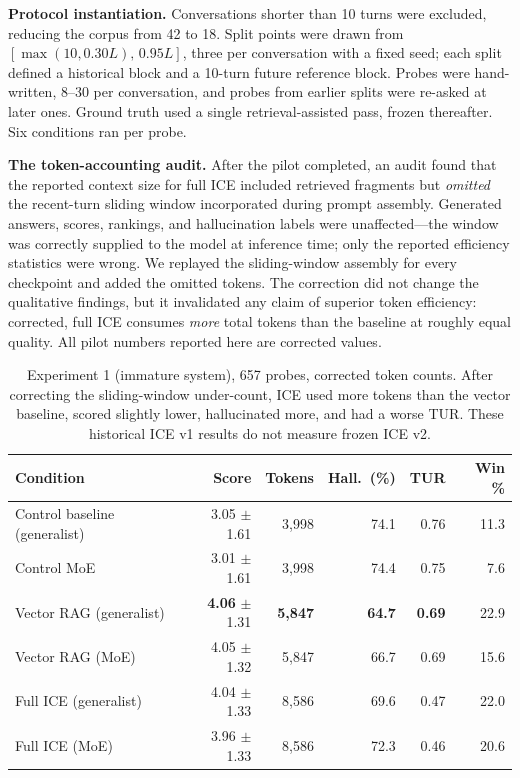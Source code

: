 \documentclass[11pt,a4paper]{article}
\begin{document}
\textbf{Protocol instantiation.} Conversations shorter than 10 turns were excluded, reducing the corpus from 42 to 18. Split points were drawn from $[\max(10,0.30L),\,0.95L]$, three per conversation with a fixed seed; each split defined a historical block and a 10-turn future reference block. Probes were hand-written, 8--30 per conversation, and probes from earlier splits were re-asked at later ones. Ground truth used a single retrieval-assisted pass, frozen thereafter. Six conditions ran per probe.

\textbf{The token-accounting audit.} After the pilot completed, an audit found that the reported context size for full ICE included retrieved fragments but \emph{omitted} the recent-turn sliding window incorporated during prompt assembly. Generated answers, scores, rankings, and hallucination labels were unaffected---the window was correctly supplied to the model at inference time; only the reported efficiency statistics were wrong. We replayed the sliding-window assembly for every checkpoint and added the omitted tokens. The correction did not change the qualitative findings, but it invalidated any claim of superior token efficiency: corrected, full ICE consumes \emph{more} total tokens than the baseline at roughly equal quality. All pilot numbers reported here are corrected values.

\begin{table}[htbp]
\centering
\small
\caption{Experiment 1 (immature system), 657 probes, corrected token counts. After correcting the sliding-window under-count, ICE used more tokens than the vector baseline, scored slightly lower, hallucinated more, and had a worse TUR. These historical ICE v1 results do not measure frozen ICE v2.}
\label{tab:exp1}
\begin{tabular}{@{}lrrrrr@{}}
\toprule
\textbf{Condition} & \textbf{Score} & \textbf{Tokens} & \textbf{Hall.\ (\%)} & \textbf{TUR} & \textbf{Win \%} \\
\midrule
Control baseline (generalist) & 3.05 $\pm$ 1.61 & 3{,}998  & 74.1 & 0.76 & 11.3 \\
Control MoE                   & 3.01 $\pm$ 1.61 & 3{,}998  & 74.4 & 0.75 & 7.6  \\
Vector RAG (generalist)       & \textbf{4.06} $\pm$ 1.31 & \textbf{5{,}847}  & \textbf{64.7} & \textbf{0.69} & 22.9 \\
Vector RAG (MoE)              & 4.05 $\pm$ 1.32 & 5{,}847  & 66.7 & 0.69 & 15.6 \\
Full ICE (generalist)         & 4.04 $\pm$ 1.33 & 8{,}586  & 69.6 & 0.47 & 22.0 \\
Full ICE (MoE)                & 3.96 $\pm$ 1.33 & 8{,}586  & 72.3 & 0.46 & 20.6 \\
\bottomrule
\end{tabular}
\end{table}
\end{document}
